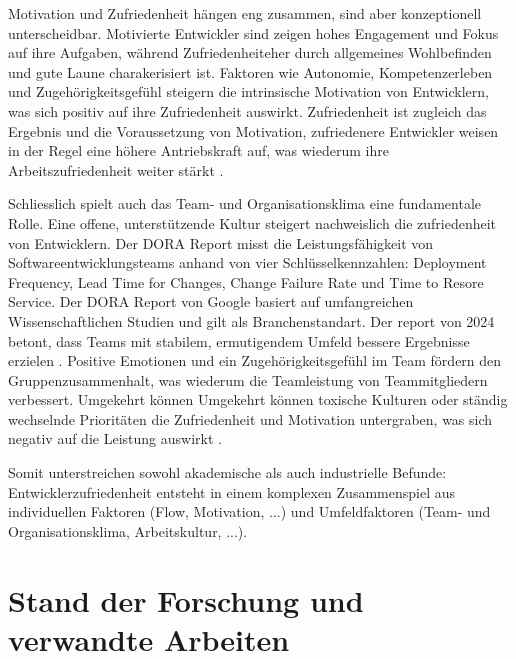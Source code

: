 \documentclass[12pt,a4paper]{report}
\begin{document}
Motivation und Zufriedenheit hängen eng zusammen, sind aber konzeptionell unterscheidbar. Motivierte Entwickler sind
zeigen hohes Engagement und Fokus auf ihre Aufgaben, während Zufriedenheiteher durch allgemeines Wohlbefinden und gute
Laune charakerisiert ist. Faktoren wie Autonomie, Kompetenzerleben und Zugehörigkeitsgefühl steigern die intrinsische 
Motivation von Entwicklern, was sich positiv auf ihre Zufriedenheit auswirkt. Zufriedenheit ist zugleich das Ergebnis und
die Voraussetzung von Motivation, zufriedenere Entwickler weisen in der Regel eine höhere Antriebskraft auf, was wiederum ihre
Arbeitszufriedenheit weiter stärkt \cite{franca_motivation_2020}.

Schliesslich spielt auch das Team- und Organisationsklima eine fundamentale Rolle. Eine offene, unterstützende Kultur steigert
nachweislich die zufriedenheit von Entwicklern. Der DORA Report misst die Leistungsfähigkeit von Softwareentwicklungsteams anhand
von vier Schlüsselkennzahlen: Deployment Frequency, Lead Time for Changes, Change Failure Rate und Time to Resore Service. Der DORA
Report von Google basiert auf umfangreichen Wissenschaftlichen Studien und gilt als Branchenstandart. Der report von 2024 betont,
dass Teams mit stabilem, ermutigendem Umfeld bessere Ergebnisse erzielen \cite{google_dora_2024}. Positive Emotionen und ein 
Zugehörigkeitsgefühl im Team fördern den Gruppenzusammenhalt, was wiederum die Teamleistung von Teammitgliedern verbessert. 
Umgekehrt können Umgekehrt können toxische Kulturen oder ständig wechselnde Prioritäten die Zufriedenheit und Motivation 
untergraben, was sich negativ auf die Leistung auswirkt \cite{sadowski_happiness_2019}.

Somit unterstreichen sowohl akademische als auch industrielle Befunde: Entwicklerzufriedenheit entsteht in einem komplexen
Zusammenspiel aus individuellen Faktoren (Flow, Motivation, ...) und Umfeldfaktoren (Team- und Organisationsklima, Arbeitskultur, 
...).

\section{Stand der Forschung und verwandte Arbeiten}
\end{document}
